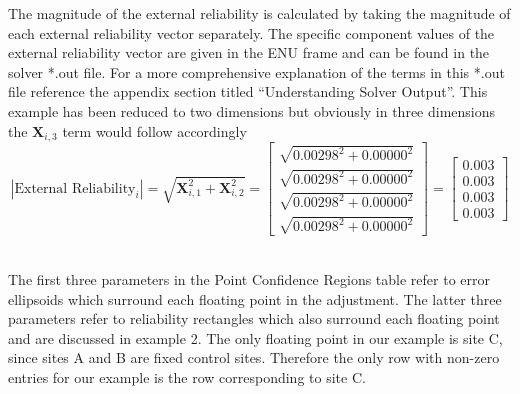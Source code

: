 The magnitude of the external reliability is calculated by taking the magnitude of each external reliability vector separately. The specific component values of the external reliability vector are given in the ENU frame and can be found in the solver *.out file. For a more comprehensive explanation of the terms in this *.out file reference the appendix section titled ``Understanding Solver Output''. This example has been reduced to two dimensions but obviously in three dimensions the $\mathbf{X}_{i,3}$ term would follow accordingly 
\begin{equation}
|\text{External Reliability}_i| = \sqrt{\mathbf{X}_{i,1}^2 + \mathbf{X}_{i,2}^2} = \left[\begin{array}{c}\sqrt{0.00298^2 + 0.00000^2}\\\sqrt{0.00298^2 + 0.00000^2}\\\sqrt{0.00298^2 + 0.00000^2}\\\sqrt{0.00298^2 + 0.00000^2}\end{array}\right]=\left[\begin{array}{c}0.003\\0.003\\0.003\\0.003\end{array}\right]
\end{equation}

{}\\

The first three parameters in the Point Confidence Regions table refer to error ellipsoids which surround each floating point in the adjustment. The latter three parameters refer to reliability rectangles which also surround each floating point and are discussed in example 2. The only floating point in our example is site C, since sites A and B are fixed control sites.  Therefore the only row with non-zero entries for our example is the row corresponding to site C.

